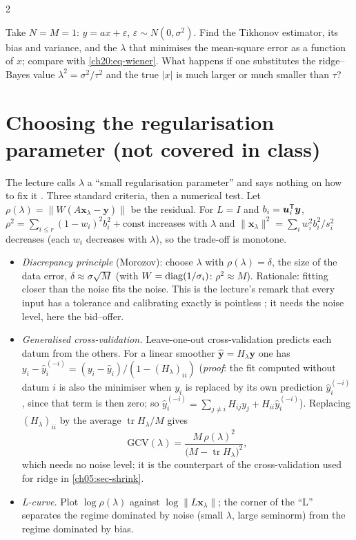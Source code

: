\begin{paracol}{2}
\begin{exercise}
Take $N=M=1$: $y=ax+\varepsilon$, $\varepsilon\sim N(0,\sigma^2)$. Find the Tikhonov estimator, its bias and variance, and the $\lambda$ that minimises the mean-square error as a function of $x$; compare with \eqref{ch20:eq-wiener}. What happens if one substitutes the ridge--Bayes value $\lambda^2=\sigma^2/\tau^2$ and the true $|x|$ is much larger or much smaller than $\tau$?
\end{exercise}

\section{Choosing the regularisation parameter (not covered in class)}\label{ch20:sec-lambda}
The lecture calls $\lambda$ a ``small regularisation parameter'' and says nothing on how to fix it . Three standard criteria, then a numerical test. Let $\rho(\lambda)=\|W(A\bm x_\lambda-\bm y)\|$ be the residual.
For $L=I$ and $b_i=\bm u_i^{\mathsf T}\bm y$, $\rho^2=\sum_{i\le r}(1-w_i)^2b_i^2+\text{const}$ increases with $\lambda$ and $\|\bm x_\lambda\|^2=\sum_iw_i^2b_i^2/s_i^2$ decreases (each $w_i$ decreases with $\lambda$), so the trade-off is monotone.

\begin{itemize}
  \item \emph{Discrepancy principle} (Morozov): choose $\lambda$ with $\rho(\lambda)=\delta$, the size of the data error, $\delta\approx\sigma\sqrt M$ (with $W=\operatorname{diag}(1/\sigma_i)$: $\rho^2\approx M$). Rationale: fitting closer than the noise fits the noise. This is the lecture's remark that every input has a
        tolerance and calibrating exactly is pointless ; it needs the noise level, here the bid--offer.
  \item \emph{Generalised cross-validation.} Leave-one-out cross-validation predicts each datum from the others. For a linear smoother $\hat{\bm y}=H_\lambda\bm y$ one has $y_i-\hat y_i^{(-i)}=(y_i-\hat y_i)/(1-(H_\lambda)_{ii})$ (\emph{proof}: the fit computed without datum $i$ is also the minimiser when
        $y_i$ is replaced by its own prediction $\hat y_i^{(-i)}$, since that term is then zero; so $\hat y_i^{(-i)}=\sum_{j\ne i}H_{ij}y_j+H_{ii}\hat y_i^{(-i)}$). Replacing $(H_\lambda)_{ii}$ by the average $\operatorname{tr}H_\lambda/M$ gives
        \[
          \mathrm{GCV}(\lambda)=\frac{M\,\rho(\lambda)^2}{\bigl(M-\operatorname{tr}H_\lambda\bigr)^2},
        \]
        which needs no noise level; it is the counterpart of the cross-validation used for ridge in \cref{ch05:sec-shrink}.
  \item \emph{L-curve.} Plot $\log\rho(\lambda)$ against $\log\|L\bm x_\lambda\|$; the corner of the ``L'' separates the regime dominated by noise (small $\lambda$, large seminorm) from the regime dominated by bias.
\end{itemize}


\end{paracol}
